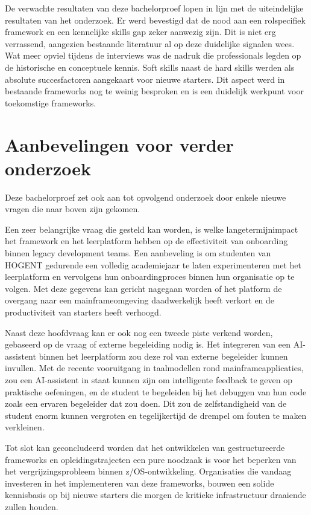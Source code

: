 De verwachte resultaten van deze bachelorproef lopen in lijn met de uiteindelijke resultaten van het onderzoek.
Er werd bevestigd dat de nood aan een rolspecifiek framework en een kennelijke skills gap zeker aanwezig zijn.
Dit is niet erg verrassend, aangezien bestaande literatuur al op deze duidelijke signalen wees.
Wat meer opviel tijdens de interviews was de nadruk die professionals legden op de historische en conceptuele kennis.
Soft skills naast de hard skills werden als absolute succesfactoren aangekaart voor nieuwe starters.
Dit aspect werd in bestaande frameworks nog te weinig besproken en is een duidelijk werkpunt voor toekomstige frameworks.

\section{Aanbevelingen voor verder onderzoek}%
\label{sec:conclusie-aanbevelingen}

Deze bachelorproef zet ook aan tot opvolgend onderzoek door enkele nieuwe vragen die naar boven zijn gekomen.

Een zeer belangrijke vraag die gesteld kan worden, is welke langetermijnimpact het framework en het leerplatform hebben op de effectiviteit van onboarding binnen legacy development teams.
Een aanbeveling is om studenten van HOGENT gedurende een volledig academiejaar te laten experimenteren met het leerplatform en vervolgens hun onboardingproces binnen hun organisatie op te volgen.
Met deze gegevens kan gericht nagegaan worden of het platform de overgang naar een mainframeomgeving daadwerkelijk heeft verkort en de productiviteit van starters heeft verhoogd.

Naast deze hoofdvraag kan er ook nog een tweede piste verkend worden, gebaseerd op de vraag of externe begeleiding nodig is.
Het integreren van een AI-assistent binnen het leerplatform zou deze rol van externe begeleider kunnen invullen.
Met de recente vooruitgang in taalmodellen rond mainframeapplicaties, zou een AI-assistent in staat kunnen zijn om intelligente feedback te geven op praktische oefeningen, en de student te begeleiden bij het debuggen van hun code zoals een ervaren begeleider dat zou doen.
Dit zou de zelfstandigheid van de student enorm kunnen vergroten en tegelijkertijd de drempel om fouten te maken verkleinen.

Tot slot kan geconcludeerd worden dat het ontwikkelen van gestructureerde frameworks en opleidingstrajecten een pure noodzaak is voor het beperken van het vergrijzingsprobleem binnen z/OS-ontwikkeling.
Organisaties die vandaag investeren in het implementeren van deze frameworks, bouwen een solide kennisbasis op bij nieuwe starters die morgen de kritieke infrastructuur draaiende zullen houden.



